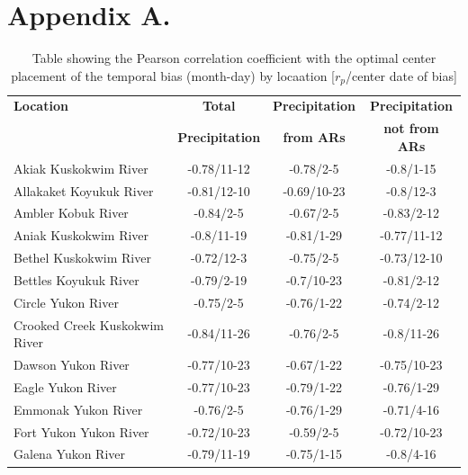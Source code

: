 \documentclass[12pts,draft]{AR_analysis_}
\begin{document}
\appendix
\section*{Appendix A.}

\begin{table}[h]  %
    \centering  %
    \caption{Table showing the Pearson correlation coefficient 
    with the optimal center placement of the
    temporal bias (month-day) by locaation [$r_{p}$/center date of bias]}  %
    \label{tab:pearson}  %
    
    \begin{tabular}{lccc}
    \toprule
    \textbf{Location} & \textbf{Total} & \textbf{Precipitation} & \textbf{Precipitation} \\
    \textbf{} & \textbf{Precipitation} & \textbf{from ARs} & \textbf{not from ARs} \\
    \midrule
	Akiak Kuskokwim River         &  -0.78/11-12 &    -0.78/2-5 &    -0.8/1-15 \\
	Allakaket Koyukuk River       &  -0.81/12-10 &  -0.69/10-23 &    -0.8/12-3 \\
	Ambler Kobuk River            &    -0.84/2-5 &    -0.67/2-5 &   -0.83/2-12 \\
	Aniak Kuskokwim River         &   -0.8/11-19 &   -0.81/1-29 &  -0.77/11-12 \\
	Bethel Kuskokwim River        &   -0.72/12-3 &    -0.75/2-5 &  -0.73/12-10 \\
	Bettles Koyukuk River         &   -0.79/2-19 &   -0.7/10-23 &   -0.81/2-12 \\
	Circle Yukon River            &    -0.75/2-5 &   -0.76/1-22 &   -0.74/2-12 \\
	Crooked Creek Kuskokwim River &  -0.84/11-26 &    -0.76/2-5 &   -0.8/11-26 \\
	Dawson Yukon River            &  -0.77/10-23 &   -0.67/1-22 &  -0.75/10-23 \\
	Eagle Yukon River             &  -0.77/10-23 &   -0.79/1-22 &   -0.76/1-29 \\
	Emmonak Yukon River           &    -0.76/2-5 &   -0.76/1-29 &   -0.71/4-16 \\
	Fort Yukon Yukon River        &  -0.72/10-23 &    -0.59/2-5 &  -0.72/10-23 \\
	Galena Yukon River            &  -0.79/11-19 &   -0.75/1-15 &    -0.8/4-16 \\

\end{tabular}
\end{table}
\end{document}

